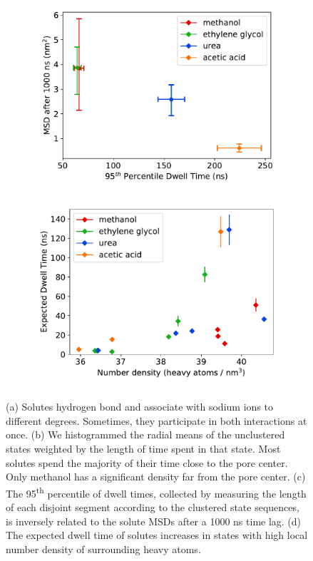 \documentclass[journal=jpcbfk,manuscript=article]{achemso}
\begin{document}
\begin{figure}
\begin{subfigure}{0.49\textwidth}
  \includegraphics[width=\textwidth]{dwell_time_summary.pdf}
  \caption{}\label{fig:dwell_time_summary}
  \end{subfigure}
  \begin{subfigure}{0.49\textwidth}
  \includegraphics[width=\textwidth]{density_comparison.pdf}
  \caption{}\label{fig:density_comparison}
  \end{subfigure}
  \caption{(a) Solutes hydrogen bond and associate with sodium ions
  to different degrees. Sometimes, they participate in both interactions at
  once. (b) We histogrammed the radial means of the unclustered states weighted
  by the length of time spent in that state. Most solutes spend the majority of
  their time close to the pore center. Only methanol has a significant density
  far from the pore center. (c) The 95\textsuperscript{th} percentile of dwell
  times, collected by measuring the length of each disjoint segment according 
  to the clustered state sequences, is inversely related to the solute MSDs
  after a 1000 ns time lag.
  (d) The expected dwell time of solutes increases in states with high local 
  number density of surrounding heavy atoms.
  }\label{fig:summaries}
  \end{figure}
  
\end{document}
